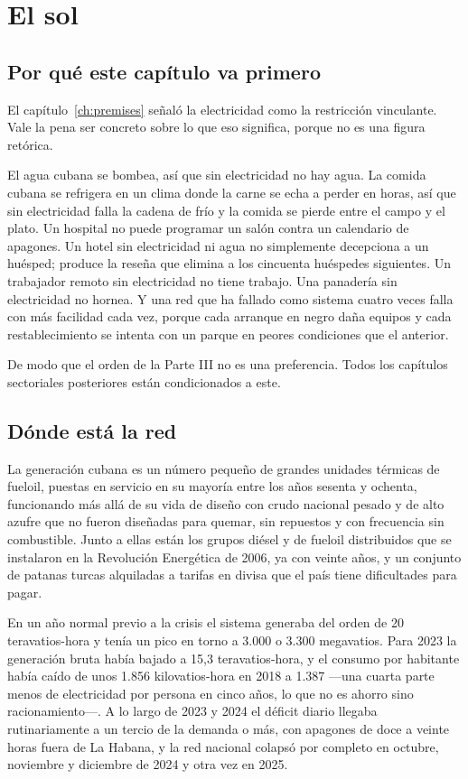 \chapter{El sol}
\label{ch:energy}

\section{Por qué este capítulo va primero}

El capítulo~\ref{ch:premises} señaló la electricidad como la restricción vinculante.
Vale la pena ser concreto sobre lo que eso significa, porque no es una figura retórica.

El agua cubana se bombea, así que sin electricidad no hay agua. La comida cubana se
refrigera en un clima donde la carne se echa a perder en horas, así que sin
electricidad falla la cadena de frío y la comida se pierde entre el campo y el plato.
Un hospital no puede programar un salón contra un calendario de apagones. Un hotel sin
electricidad ni agua no simplemente decepciona a un huésped; produce la reseña que
elimina a los cincuenta huéspedes siguientes. Un trabajador remoto sin electricidad no
tiene trabajo. Una panadería sin electricidad no hornea. Y una red que ha fallado como
sistema cuatro veces falla con más facilidad cada vez, porque cada arranque en negro
daña equipos y cada restablecimiento se intenta con un parque en peores condiciones que
el anterior.

De modo que el orden de la Parte III no es una preferencia. Todos los capítulos
sectoriales posteriores están condicionados a este.

\section{Dónde está la red}

La generación cubana es un número pequeño de grandes unidades térmicas de fueloil,
puestas en servicio en su mayoría entre los años sesenta y ochenta, funcionando más allá
de su vida de diseño con crudo nacional pesado y de alto azufre que no fueron diseñadas
para quemar, sin repuestos y con frecuencia sin combustible. Junto a ellas están los
grupos diésel y de fueloil distribuidos que se instalaron en la Revolución Energética de
2006, ya con veinte años, y un conjunto de patanas turcas alquiladas a tarifas en divisa
que el país tiene dificultades para pagar.

En un año normal previo a la crisis el sistema generaba del orden de 20
teravatios-hora y tenía un pico en torno a 3.000 o 3.300 megavatios.\unv{} Para 2023 la
generación bruta había bajado a 15,3 teravatios-hora, y el consumo por habitante había
caído de unos 1.856 kilovatios-hora en 2018 a 1.387 ---una cuarta parte menos de
electricidad por persona en cinco años, lo que no es ahorro sino racionamiento---. A lo
largo de 2023 y 2024 el déficit diario llegaba rutinariamente a un tercio de la demanda
o más, con apagones de doce a veinte horas fuera de La Habana, y la red nacional colapsó
por completo en octubre, noviembre y diciembre de 2024 y otra vez en 2025.

